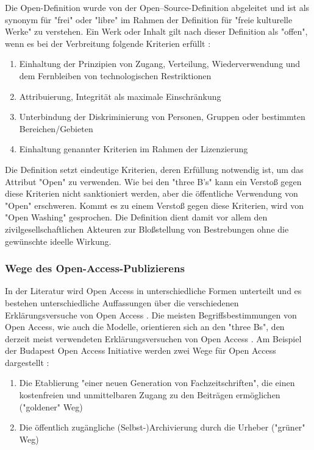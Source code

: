 Die Open-Definition wurde von der Open–Source-Definition abgeleitet und ist als synonym für "frei" oder "libre" im Rahmen der Definition für "freie kulturelle Werke" zu verstehen. Ein Werk oder Inhalt gilt nach dieser Definition als "offen", wenn es bei der Verbreitung folgende Kriterien erfüllt \cite{open_definition}:
\begin{enumerate}
\item Einhaltung der Prinzipien von Zugang, Verteilung, Wiederverwendung und dem Fernbleiben von technologischen Restriktionen
\item Attribuierung, Integrität als maximale Einschränkung
\item Unterbindung der Diskriminierung von Personen, Gruppen oder bestimmten Bereichen/Gebieten
\item Einhaltung genannter Kriterien im Rahmen der Lizenzierung
\end{enumerate}

Die Definition setzt eindeutige Kriterien, deren Erfüllung notwendig ist, um das Attribut "Open" zu verwenden. Wie bei den "three B's" kann ein Verstoß gegen diese Kriterien nicht sanktioniert werden, aber die öffentliche Verwendung von "Open" erschweren. Kommt es zu einem Verstoß gegen diese Kriterien, wird von "Open Washing" gesprochen. Die Definition dient damit vor allem den zivilgesellschaftlichen Akteuren zur Bloßstellung von Bestrebungen ohne die gewünschte ideelle Wirkung.

\subsubsection{Wege des Open-Access-Publizierens}

In der Literatur wird Open Access in unterschiedliche Formen unterteilt \cite{CREATe_2014} \cite{albert_2006_open_implications} und es bestehen unterschiedliche Auffassungen über die verschiedenen Erklärungsversuche von Open Access \cite{CREATe_2014} \cite{cite:22b} \cite{lewis_2012_inevitability}. Die meisten Begriffsbestimmungen von Open Access, wie auch die Modelle, orientieren sich an den "three Bs", den derzeit meist verwendeten Erklärungsversuchen von Open Access \cite{Adema_2014_open_access}. Am Beispiel der Budapest Open Access Initiative werden zwei Wege für Open Access dargestellt \cite{albert_2006_open_implications}:
\begin{enumerate}
\item Die Etablierung "einer neuen Generation von Fachzeitschriften", die einen kostenfreien und unmittelbaren Zugang zu den Beiträgen ermöglichen ("goldener" Weg)
\item Die öffentlich zugängliche (Selbst-)Archivierung durch die Urheber ("grüner" Weg) \cite{adema_2013_political} \cite{hall_2008_digitize}
\end{enumerate}

